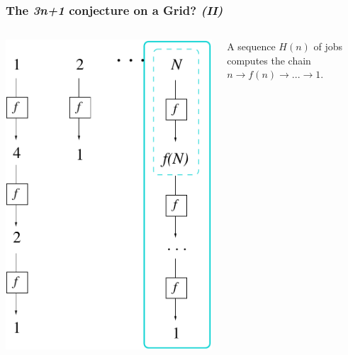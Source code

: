 \documentclass[presentation]{beamer}
\newcommand{\largeskip}{\vspace{1em}}
\def\+{\largeskip}
\begin{document}
  \begin{frame}
    \frametitle{The \emph{3n+1} conjecture on a Grid? \emph{(II)}}
    \label{sec:7b}

    \+
    \begin{columns}[c]
      \includegraphics[height=0.8\textheight]{3n+1_S}
      
      A sequence $H(n)$ of jobs computes the chain $n \to f(n) \to
      ... \to 1$.
    \end{columns}
  \end{frame}
\end{document}
